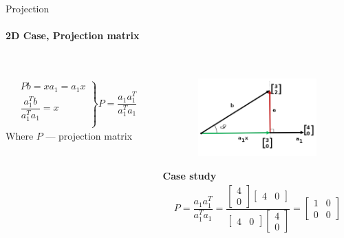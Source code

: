 \documentclass[aspectratio=169]{beamer}
\begin{document}
\begin{frame}[t]{Projection}
    \framesubtitle{2D Case, Projection matrix \\ \ }
    \vspace{-0.8cm}
    \begin{columns}[T,onlytextwidth]
        \begin{column}{0.49\textwidth}
            \begin{align*}
                \left.\begin{matrix}
                Pb = xa_1 = a_1x \\
                \dfrac{a_1^Tb}{a_1^Ta_1} = x \\
                \end{matrix} \right\} P = \dfrac{a_1a_1^T}{a_1^Ta_1}
                \end{align*}
                Where $P$ --- projection matrix
        \end{column}
        \begin{column}{0.49\textwidth}
            \vspace{-1.8cm}
            \begin{figure}[H]
                \centering\includegraphics[height=3cm,width=1\textwidth,keepaspectratio]{resources/fig1.png}
                \label{fig:resources/fig1.png}
            \end{figure}
            \vspace{-1cm}
            \textbf{Case study}
            \begin{align*}
                P = \dfrac{a_1a_1^T}{a_1^Ta_1} = \dfrac{\begin{bmatrix}4\\0\end{bmatrix}\begin{bmatrix}4&0\end{bmatrix}}{\begin{bmatrix}4&0\end{bmatrix}\begin{bmatrix}4\\0\end{bmatrix}} = \begin{bmatrix}1&0\\0&0\end{bmatrix}\\

\end{align*}
\end{column}
\end{columns}
\end{frame}
\end{document}

